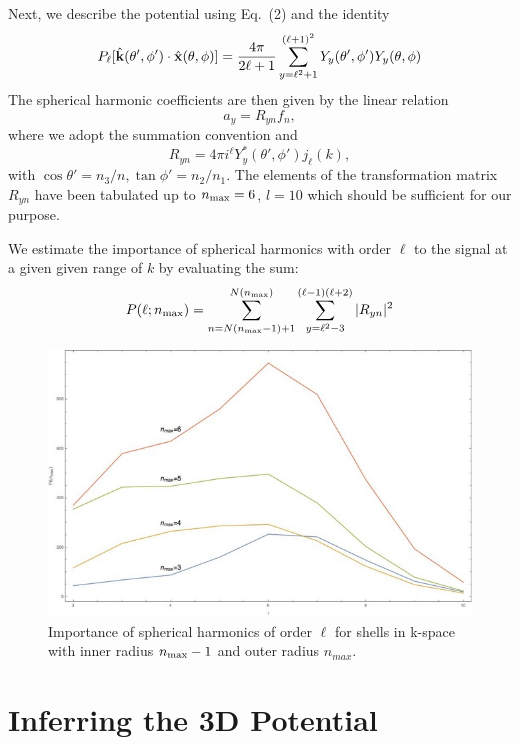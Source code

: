 \documentclass[12pt]{article}
\def\Response{R_{yn}}
\begin{document}
Next, we describe the potential using Eq.~(2) and the identity
\begin{equation}
P_{\ell}[\hat{\bf k}(\theta',\phi')\cdot\hat{\bf x}(\theta,\phi)]=\frac{4\pi}{2\ell+1}\sum_{y=\ell^2+1}^{(\ell+1)^2}Y_y(\theta',\phi')Y_y(\theta,\phi)
\end{equation}
The spherical harmonic coefficients are then given by the linear relation
\begin{equation}
a_y=\Response f_n,
\end{equation}
where we adopt the summation convention and
\begin{equation}
\Response =4\pi i^\ell Y_y^\ast(\theta',\phi')j_\ell(k),
\end{equation}
with $\cos\theta'=n_3/n,\tan\phi'=n_2/n_1$. The elements of the transformation matrix $\Response$ have been tabulated up to $n_{\rm max}=6$, $l=10$ which should be sufficient for our purpose.

We estimate the importance of spherical harmonics with order $\ell$ to the signal at a given given range of $k$ by evaluating the sum:
\begin{equation}
P(\ell;n_{\rm max})=\sum_{n=N(n_{\rm max}-1)+1}^{N(n_{\rm max})}\sum_{y=\ell^2-3}^{(\ell-1)(\ell+2)}|\Response|^2
\end{equation}
\begin{figure}[h!]
\centering
\includegraphics[width=6in]{fig6.jpg}
\caption{Importance of spherical harmonics of order $\ell$ for shells in k-space with inner radius $n_{\rm max}-1$ and outer radius $n_{max}$.}
\end{figure}

\section{Inferring the 3D Potential}
\end{document}
